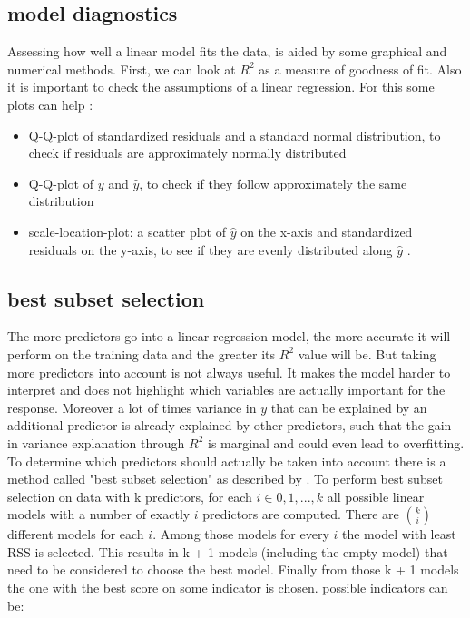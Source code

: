 \documentclass[12 pt]{scrartcl}
\begin{document}
\subsection{model diagnostics}
Assessing how well a linear model fits the data, is aided by some graphical and numerical methods.
First, we can look at $R^2$ as a measure of goodness of fit. Also it is important to check the assumptions of a linear regression. For this some plots can help \citep{Understa39}:
\begin{itemize}
  \item Q-Q-plot of standardized residuals and a standard normal distribution, to check if residuals are approximately normally distributed
  \item Q-Q-plot of $y$ and $\hat{y}$, to check if they follow approximately the same distribution
  \item scale-location-plot: a scatter plot of $\hat{y}$ on the x-axis and standardized residuals on the y-axis, to see if they are evenly distributed along $\hat{y}$ .
\end{itemize}

\subsection{best subset selection}

The more predictors go into a linear regression model, the more accurate it will perform on the training data and the greater its $R^2$ value will be. But taking more predictors into account is not always useful. It makes the model harder to interpret and does not highlight which variables are actually important for the response. Moreover a lot of times variance in $y$ that can be explained by an additional predictor is already explained by other predictors, such that the gain in variance explanation through $R^2$ is marginal and could even lead to overfitting. \\
To determine which predictors should actually be taken into account there is a method called "best subset selection" as described by \citet[p.~227]{james2013introduction}.
To perform best subset selection on data with k predictors, for each $i \in {0,1,...,k}$ all possible linear models with a number of exactly $i$ predictors are computed. There are ${k}\choose{i}$ different models for each $i$. Among those models for every $i$ the model with least RSS is selected. This results in k + 1 models (including the empty model) that need to be considered to choose the best model. Finally from those  k + 1 models the one with the best score on some indicator is chosen.
possible indicators can be:
\end{document}

